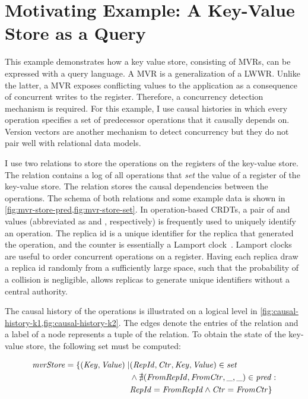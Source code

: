 \section{Motivating Example: A Key-Value Store as a Query}\label{sec:motivating-example}

This example demonstrates how a key value store,
consisting of \acfp{MVR}, can be expressed with a query language.
A \ac{MVR} is a generalization of a \ac{LWWR}.
Unlike the latter, a \ac{MVR} exposes conflicting values to the application
as a consequence of concurrent writes to the register.
Therefore, a concurrency detection mechanism is required.
For this example, I use causal histories in which every operation specifies
a set of predecessor operations that it causally depends on.
Version vectors are another mechanism to detect concurrency
but they do not pair well with relational data models.

I use two relations to store the operations on the registers of the key-value store.
The  relation contains a log of all operations that \emph{set} the
value of a register of the key-value store.
The  relation stores the causal dependencies between the operations.
The schema of both relations and some example data is shown in
\ref{fig:mvr-store-pred,fig:mvr-store-set}.
In operation-based \acp{CRDT}, a pair of  and  values
(abbreviated as  and , respectively) is frequently used
to uniquely identify an operation.
The replica id is a unique identifier for the replica that generated the
operation, and the counter is essentially a Lamport clock~\cite{lamport2019time}.
Lamport clocks are useful to order concurrent operations on a register.
Having each replica draw a replica id randomly from a sufficiently large space,
such that the probability of a collision is negligible,
allows replicas to generate unique identifiers without a central authority.



The causal history of the operations is illustrated on a logical level
in \ref{fig:causal-history-k1,fig:causal-history-k2}.
The edges denote the entries of the  relation and a
 label of a node represents a tuple of the
 relation.
To obtain the state of the key-value store, the following set must be computed:

\begin{align*}
    \mathit{mvrStore} = \{ (\mathit{Key}, \mathit{Value}) \mid
     & (\mathit{RepId}, \mathit{Ctr}, \mathit{Key}, \mathit{Value}) \in \mathit{set}                      \\
     & \land \nexists (\mathit{FromRepId}, \mathit{FromCtr}, \mathit{\_}, \mathit{\_}) \in \mathit{pred}: \\
     & \mathit{RepId} = \mathit{FromRepId} \land \mathit{Ctr} = \mathit{FromCtr} \}
\end{align*}


